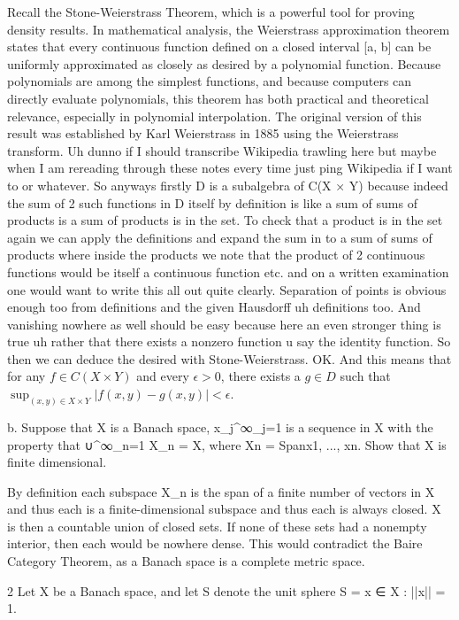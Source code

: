 Recall the Stone-Weierstrass Theorem, which is a powerful tool for proving density results. In mathematical analysis, the Weierstrass approximation theorem states that every continuous function defined on a closed interval [a, b] can be uniformly approximated as closely as desired by a polynomial function. Because polynomials are among the simplest functions, and because computers can directly evaluate polynomials, this theorem has both practical and theoretical relevance, especially in polynomial interpolation. The original version of this result was established by Karl Weierstrass in 1885 using the Weierstrass transform. Uh dunno if I should transcribe Wikipedia trawling here but maybe when I am rereading through these notes every time just ping Wikipedia if I want to or whatever. So anyways firstly D is a subalgebra of C(X × Y) because indeed the sum of 2 such functions in D itself by definition is like a sum of sums of products is a sum of products is in the set. To check that a product is in the set again we can apply the definitions and expand the sum in to a sum of sums of products where inside the products we note that the product of 2 continuous functions would be itself a continuous function etc. and on a written examination one would want to write this all out quite clearly. Separation of points is obvious enough too from definitions and the given Hausdorff uh definitions too. And vanishing nowhere as well should be easy because here an even stronger thing is true uh rather that there exists a nonzero function u say the identity function. So then we can deduce the desired with Stone-Weierstrass. OK. And this means that for any $f \in C(X \times Y)$ and every $\epsilon > 0$, there exists a $g \in D$ such that $\sup_{(x,y) \in X \times Y} |f(x, y) - g(x, y)| < \epsilon$.

b. Suppose that X is a Banach space, {x_j}^∞_{j=1} is a sequence in X with the property that ∪^∞_{n=1} X_n = X, where Xn = Span{x1, ..., xn}. Show that X is finite dimensional.

By definition each subspace X_n is the span of a finite number of vectors in X and thus each is a finite-dimensional subspace and thus each is always closed. X is then a countable union of closed sets. If none of these sets had a nonempty interior, then each would be nowhere dense. This would contradict the Baire Category Theorem, as a Banach space is a complete metric space.

2 Let X be a Banach space, and let S denote the unit sphere S = {x ∈ X : ||x|| = 1}.

